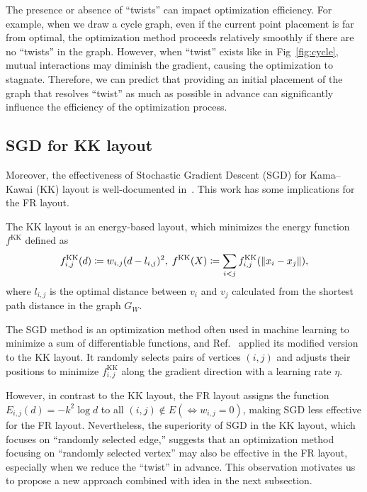 \documentclass[dvipdfmx,journal]{IEEEtran}
\newcommand{\defeq}{\coloneqq}
\begin{document}
The presence or absence of ``twists'' can impact optimization efficiency.
For example, when we draw a cycle graph, even if the current point placement is far from optimal, the optimization method proceeds relatively smoothly if there are no ``twists'' in the graph.
However, when ``twist'' exists like in Fig~\ref{fig:cycle}, mutual interactions may diminish the gradient, causing the optimization to stagnate.
Therefore, we can predict that providing an initial placement of the graph that resolves ``twist'' as much as possible in advance can significantly influence the efficiency of the optimization process.

\subsection{SGD for KK layout}\label{ssec:sgd}

Moreover, the effectiveness of Stochastic Gradient Descent (SGD) for Kama--Kawai (KK) layout is well-documented in~\cite{8419285}. This work has some implications for the FR layout.

The KK layout is an energy-based layout, which minimizes the energy function $f^{\mathrm{KK}}$ defined as
\begin{equation*}
    f^{\mathrm{KK}}_{i,j}(d) \defeq w_{i,j} (d-l_{i,j})^2, \;
    f^{\mathrm{KK}}(X) \defeq \sum_{i<j} f^{\mathrm{KK}}_{i,j}(\norm{x_i - x_j}),
\end{equation*}
where $l_{i,j}$ is the optimal distance between $v_i$ and $v_j$ calculated from the shortest path distance in the graph $G_W$.

The SGD method is an optimization method often used in machine learning to minimize a sum of differentiable functions, and Ref.~\cite{8419285} applied its modified version to the KK layout.
It randomly selects pairs of vertices $(i,j)$ and adjusts their positions to minimize $f^{\mathrm{KK}}_{i,j}$ along the gradient direction with a learning rate $\eta$.

However, in contrast to the KK layout, the FR layout assigns the function $E_{i,j}(d)=-k^2\log{d}$ to all $(i,j) \notin E (\iff w_{i,j}=0)$, making SGD less effective for the FR layout.
Nevertheless, the superiority of SGD in the KK layout, which focuses on ``randomly selected edge,'' suggests that an optimization method focusing on ``randomly selected vertex'' may also be effective in the FR layout, especially when we reduce the ``twist'' in advance.
This observation motivates us to propose a new approach combined with idea in the next subsection.
\end{document}
